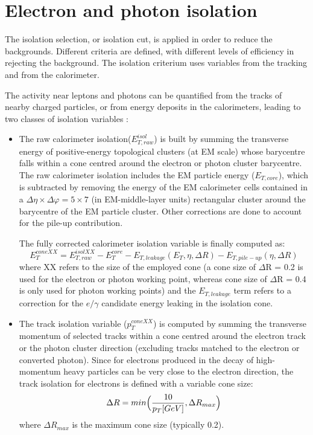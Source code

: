 \documentclass[a4paper, oneside, 11pt, openright]{book}
\begin{document}
		
	
		\section{Electron and photon isolation}\label{section:Iso}
		The isolation selection, or isolation cut, is applied in order to reduce the backgrounds. Different criteria are defined, with different levels
		of efficiency in rejecting the background. The isolation criterium uses variables from the tracking and from the calorimeter. \cite{El ph isol}
		
		The activity near leptons and photons can be quantified from the tracks of nearby charged particles, or from energy deposits in the calorimeters, leading to two classes of isolation variables \cite{El ph reco}:
		\begin{itemize}
			\item The raw calorimeter isolation($E_{T,raw}^{isol}$) is built by summing the transverse energy of positive-energy topological clusters (at EM scale) whose barycentre falls within a cone centred around the electron or photon cluster barycentre. The raw calorimeter isolation includes the EM particle energy ($E_{T,core}$), which is subtracted by removing the energy of the EM calorimeter cells contained in a $\Delta\eta \times \Delta\varphi = 5 \times 7$ (in EM-middle-layer units) rectangular
			cluster around the barycentre of the EM particle cluster. Other corrections are done to account for the pile-up contribution. %
			
			The fully corrected calorimeter isolation variable is finally computed as:
			$$ 
			E_{T}^{coneXX} = E_{T,raw}^{isolXX} - E_{T}^{core} - E_{T,leakage}(E_T,\eta,\Delta R) -E_{T,pile-up}(\eta,\Delta R)
			$$
			where XX refers to the size of the employed cone (a cone size of $\Delta$R = 0.2 is used for the electron or photon working point, whereas
			cone size of $\Delta$R = 0.4 is only used for photon working points) and the $E_{T,leakage}$ term refers to a correction for the $e/\gamma$ candidate energy leaking in the isolation cone.
			\item The track isolation variable ($p_T^{coneXX}$) is computed by summing the transverse momentum of selected tracks within a cone centred around the electron track or the photon cluster direction (excluding tracks matched to the electron or converted photon)\cite{El ph isol}. Since for electrons produced in the decay of high-momentum heavy particles can be very close to the electron direction, the track isolation for electrons is defined with a variable cone size:
			$$
			\Delta R = min\Bigl({\frac{10}{p_T[GeV]},\Delta R_{max}}\Bigr)
			$$
			where $\Delta R_{max}$ is the maximum cone size (typically 0.2).
			

\end{itemize}
\end{document}
